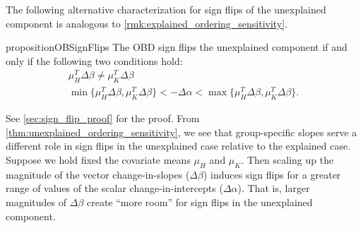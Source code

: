 The following alternative characterization for sign flips of the unexplained component is analogous to \cref{rmk:explained_ordering_sensitivity}.
%
\begin{restatable}{proposition}{OBSignFlips}
    \label{thm:unexplained_ordering_sensitivity}
    The OBD sign flips the unexplained component if and only if the following two conditions hold:
    \begin{gather}
    	\nonumber
    	\mu_H^T \Delta\beta \neq \mu_K^T \Delta\beta \\
    \label{eq:sign_flip_condition}
   	 \min\{\mu_H^T \Delta\beta, \mu_K^T \Delta\beta\} < -\Delta\alpha < \max\{\mu_H^T \Delta\beta, \mu_K^T \Delta\beta\}.
    \end{gather}
\end{restatable}    
See \cref{sec:sign_flip_proof} for the proof.
From \cref{thm:unexplained_ordering_sensitivity}, we see that group-specific slopes serve a different role in sign flips in the unexplained case relative to the explained case.
Suppose we hold fixed the covariate means $\mu_H$ and $\mu_K$. Then scaling up the magnitude of the vector change-in-slopes ($\Delta \beta$) induces sign flips for a greater range of values 
of the scalar change-in-intercepts ($\Delta \alpha$).
That is, larger magnitudes of \( \Delta \beta \) create ``more room'' for sign flips in the unexplained component.

